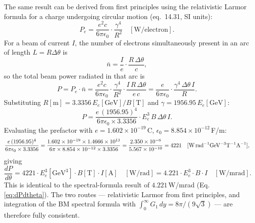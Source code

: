 \documentclass[11pt,a4paper]{article}
\begin{document}
The same result can be derived from first principles using the relativistic Larmor
formula for a charge undergoing circular motion \cite{jackson1999} (eq.~14.31, SI units):
\begin{equation}
  P_e = \frac{e^2 c}{6\pi\epsilon_0}\cdot\frac{\gamma^4}{R^2} \quad [\text{W/electron}].
  \label{eq:larmor}
\end{equation}
For a beam of current $I$, the number of electrons simultaneously present in an arc
of length $L = R\Delta\theta$ is
\begin{equation}
  \bar{n} = \frac{I}{e}\cdot\frac{R\,\Delta\theta}{c},
\end{equation}
so the total beam power radiated in that arc is
\begin{equation}
  P = P_e\cdot\bar{n}
    = \frac{e^2 c}{6\pi\epsilon_0}\cdot\frac{\gamma^4}{R^2}
      \cdot\frac{I\,R\,\Delta\theta}{e\,c}
    = \frac{e}{6\pi\epsilon_0}\cdot\frac{\gamma^4\,\Delta\theta\,I}{R}.
  \label{eq:Parc}
\end{equation}
Substituting $R[\text{m}] = 3.3356\,E_e[\text{GeV}]/B[\text{T}]$ and
$\gamma = 1956.95\,E_e[\text{GeV}]$:
\begin{equation}
  P = \frac{e\,(1956.95)^4}{6\pi\epsilon_0\times 3.3356}
      \cdot E_e^3\,B\,\Delta\theta\,I.
\end{equation}
Evaluating the prefactor with $e=1.602\times10^{-19}$\,C,
$\epsilon_0=8.854\times10^{-12}$\,F/m:
\begin{equation}
  \frac{e\,(1956.95)^4}{6\pi\epsilon_0\times 3.3356}
  = \frac{1.602\times10^{-19}\times 1.4666\times10^{13}}
         {6\pi\times 8.854\times10^{-12}\times 3.3356}
  = \frac{2.350\times10^{-6}}{5.567\times10^{-10}}
  = 4221 \quad [\text{W\,rad}^{-1}\text{GeV}^{-3}\text{T}^{-1}\text{A}^{-1}],
\end{equation}
giving
\begin{equation}
  \boxed{\frac{dP}{d\theta} = 4221\cdot E_e^3[\text{GeV}^3]\cdot B[\text{T}]
         \cdot I[\text{A}] \quad [\text{W/rad}]}
  = 4.221\cdot E_e^3\cdot B\cdot I \quad [\text{W/mrad}].
  \label{eq:dPdtheta_larmor}
\end{equation}
This is identical to the spectral-formula result of $4.221$\,W/mrad
(Eq.\,\ref{eq:dPdtheta}).  The two routes --- relativistic Larmor
from first principles, and integration of the BM spectral formula with
$\int_0^\infty G_1\,dy = 8\pi/(9\sqrt{3})$ --- are therefore fully consistent.

\end{document}
